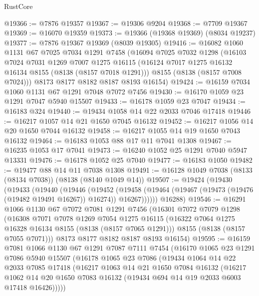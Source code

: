 \begin{lexlean}{RustCore}
\begin{coremodule}
@19366 := @7876 @19357
@19367 := @19306 @9204
@19368 := @7709 @19367
@19369 := @16070 @19359
@19373 := @19366 (@19368 @19369) (@8034 @19237)
@19377 := @7876 @19367 @19369 (@8039 @19305)
@19416 := @16082
    @1060
    @1131
    @67
    @7025
    @7034
    @1291
    @7458
    (@16094
      @7025
      @7032
      @1298
      (@16103
        @7024
        @7031
        @1269
        @7007
        @1275
        @16115
        (@16124 @7017 @1275 @16132 @16134 @8155 (@8138 (@8157 @7018 @1291)))
        @8155
        (@8138 (@8157 @7008 @7024)))
      @8173
      @8177
      @8182
      @8187
      @8193
      @16154)
@19424 := @16159 @7034 @1060 @1131 @67 @1291 @7048 @7072 @7456
@19430 := @16170 @1059 @23 @1291 @7047 @5940 @15507
@19433 := @16178 @1059 @23 @7047
@19434 := @16183 @324
@19440 := @19434 @1058 @14 @22 @2033 @7046 @17418
@19446 := @16217 @1057 @14 @21 @1650 @7045 @16132
@19452 := @16217 @1056 @14 @20 @1650 @7044 @16132
@19458 := @16217 @1055 @14 @19 @1650 @7043 @16132
@19464 := @16183 @1053 @88 @17 @11 @7041 @1308
@19467 := @16235 @1053 @17 @7041
@19473 := @16240 @1052 @25 @1291 @7040 @5947 @13331
@19476 := @16178 @1052 @25 @7040
@19477 := @16183 @1050
@19482 := @19477 @88 @14 @11 @7038 @1308
@19491 := @16128 @1049 @7038 (@8133 (@8134 @7038)) (@8138 (@8140 @1049 @14))
@19507 := @19424
    (@19430
      (@19433
        (@19440
          (@19446
            (@19452
              (@19458 (@19464 (@19467 (@19473 (@19476 (@19482 @19491 @16267)) @16274)) @16267))))))
      @16288)
@19546 := @16291
    @1066
    @1130
    @67
    @7072
    @7081
    @1291
    @7456
    (@16301
      @7072
      @7079
      @1298
      (@16308
        @7071
        @7078
        @1269
        @7054
        @1275
        @16115
        (@16322 @7064 @1275 @16328 @16134 @8155 (@8138 (@8157 @7065 @1291)))
        @8155
        (@8138 (@8157 @7055 @7071)))
      @8173
      @8177
      @8182
      @8187
      @8193
      @16154)
@19595 := @16159
    @7081
    @1066
    @1130
    @67
    @1291
    @7087
    @7111
    @7454
    (@16170
      @1065
      @23
      @1291
      @7086
      @5940
      @15507
      (@16178
        @1065
        @23
        @7086
        (@19434
          @1064
          @14
          @22
          @2033
          @7085
          @17418
          (@16217
            @1063
            @14
            @21
            @1650
            @7084
            @16132
            (@16217
              @1062
              @14
              @20
              @1650
              @7083
              @16132
              (@19434 @694 @14 @19 @2033 @6003 @17418 @16426)))))

\end{coremodule}
\end{lexlean}
